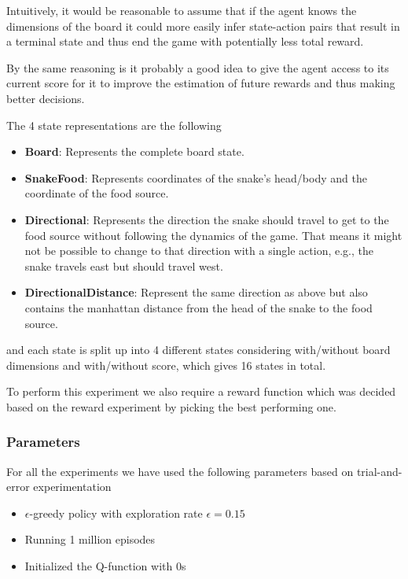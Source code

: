 \documentclass[report.tex]{subfiles}
\begin{document}
    Intuitively, it would be reasonable to assume that if the agent knows the dimensions of the board it could more easily infer state-action pairs that result in a terminal state and thus end the game with potentially less total reward.

    By the same reasoning is it probably a good idea to give the agent access to its current score for it to improve the estimation of future rewards and thus making better decisions.

    The 4 state representations are the following

    \begin{itemize}
        \item \textbf{Board}: Represents the complete board state.
        \item \textbf{SnakeFood}: Represents coordinates of the snake's head/body and the coordinate of the food source.
        \item \textbf{Directional}: Represents the direction the snake should travel to get to the food source without following the dynamics of the game. That means it might not be possible to change to that direction with a single action, e.g., the snake travels east but should travel west.
        \item \textbf{DirectionalDistance}: Represent the same direction as above but also contains the manhattan distance from the head of the snake to the food source.
    \end{itemize}

    and each state is split up into 4 different states considering with/without board dimensions and with/without score, which gives 16 states in total.

    To perform this experiment we also require a reward function which was decided based on the reward experiment by picking the best performing one.

    \subsubsection*{Parameters}

    For all the experiments we have used the following parameters based on trial-and-error experimentation

    \begin{itemize}
        \item $\epsilon$-greedy policy with exploration rate $\epsilon = 0.15$
        \item Running 1 million episodes
        \item Initialized the Q-function with 0s
    \end{itemize}
\end{document}
